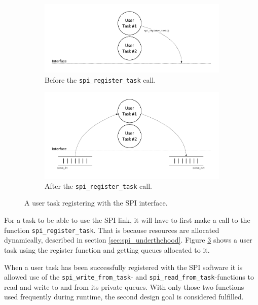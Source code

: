 \begin{figure}[htb]
  \begin{subfigure}[b]{0.495\textwidth}
    \centering
    \includegraphics[width=\textwidth,clip,trim=12 -46 12 0]{content/04_communication/figures/spi_task_diagram_initial_1.pdf}
    \caption{Before the \texttt{spi\_register\_task} call.}
    \label{fig:spi_task_diagram_initial_1}
  \end{subfigure}
  \begin{subfigure}[b]{0.495\textwidth}
    \centering
    \includegraphics[width=\textwidth,clip,trim=12 0 12 0]{content/04_communication/figures/spi_task_diagram_initial_2.pdf}
    \caption{After the \texttt{spi\_register\_task} call.}
    \label{fig:spi_task_diagram_initial_2}
  \end{subfigure}
  \caption{A user task registering with the SPI interface.}
  \label{fig:spi_register_task}
\end{figure}%

For a task to be able to use the SPI link, it will have to first make a call to the function \texttt{spi\_register\_task}. That is because resources are allocated dynamically, described in section \ref{sec:spi_underthehood}. Figure \ref{fig:spi_register_task} shows a user task using the register function and getting queues allocated to it. 

When a user task has been successfully registered with the SPI software it is allowed use of the \texttt{spi\_write\_from\_task}- and \texttt{spi\_read\_from\_task}-functions to read and write to and from its private queues. With only those two functions used frequently during runtime, the second design goal is considered fulfilled.

